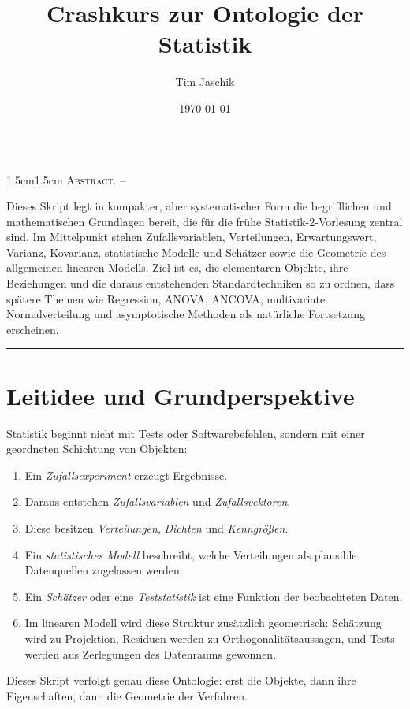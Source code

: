 \documentclass[10pt, letterpaper]{article}
\title{Crashkurs zur Ontologie der Statistik}
\author{Tim Jaschik}
\date{\today}
\renewenvironment{abstract}
  {
    \begin{adjustwidth}{1.5cm}{1.5cm}
    \small
    \textsc{Abstract. –}%
  }
  {
    \end{adjustwidth}
  }
\begin{document}
\maketitle
\rule{\textwidth}{0.5pt}
\begin{abstract}
Dieses Skript legt in kompakter, aber systematischer Form die begrifflichen und mathematischen Grundlagen bereit, die für die frühe Statistik-2-Vorlesung zentral sind. Im Mittelpunkt stehen Zufallsvariablen, Verteilungen, Erwartungswert, Varianz, Kovarianz, statistische Modelle und Schätzer sowie die Geometrie des allgemeinen linearen Modells. Ziel ist es, die elementaren Objekte, ihre Beziehungen und die daraus entstehenden Standardtechniken so zu ordnen, dass spätere Themen wie Regression, ANOVA, ANCOVA, multivariate Normalverteilung und asymptotische Methoden als natürliche Fortsetzung erscheinen.
\end{abstract}
\rule{\textwidth}{0.5pt}
\vspace{0.5cm}

\tableofcontents

\pagebreak

\section{Leitidee und Grundperspektive}

Statistik beginnt nicht mit Tests oder Softwarebefehlen, sondern mit einer geordneten Schichtung von Objekten:

\begin{enumerate}
    \item Ein \emph{Zufallsexperiment} erzeugt Ergebnisse.
    \item Daraus entstehen \emph{Zufallsvariablen} und \emph{Zufallsvektoren}.
    \item Diese besitzen \emph{Verteilungen}, \emph{Dichten} und \emph{Kenngrößen}.
    \item Ein \emph{statistisches Modell} beschreibt, welche Verteilungen als plausible Datenquellen zugelassen werden.
    \item Ein \emph{Schätzer} oder eine \emph{Teststatistik} ist eine Funktion der beobachteten Daten.
    \item Im linearen Modell wird diese Struktur zusätzlich geometrisch: Schätzung wird zu Projektion, Residuen werden zu Orthogonalitätsaussagen, und Tests werden aus Zerlegungen des Datenraums gewonnen.
\end{enumerate}

Dieses Skript verfolgt genau diese Ontologie: erst die Objekte, dann ihre Eigenschaften, dann die Geometrie der Verfahren.
\end{document}
